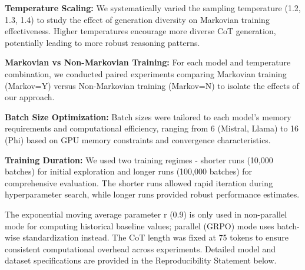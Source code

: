 \documentclass{article}
\begin{document}
\textbf{Temperature Scaling:} We systematically varied the sampling temperature (1.2, 1.3, 1.4) to study the effect of generation diversity on Markovian training effectiveness. Higher temperatures encourage more diverse CoT generation, potentially leading to more robust reasoning patterns.

\textbf{Markovian vs Non-Markovian Training:} For each model and temperature combination, we conducted paired experiments comparing Markovian training (Markov=Y) versus Non-Markovian training (Markov=N) to isolate the effects of our approach.

\textbf{Batch Size Optimization:} Batch sizes were tailored to each model's memory requirements and computational efficiency, ranging from 6 (Mistral, Llama) to 16 (Phi) based on GPU memory constraints and convergence characteristics.

\textbf{Training Duration:} We used two training regimes - shorter runs (10,000 batches) for initial exploration and longer runs (100,000 batches) for comprehensive evaluation. The shorter runs allowed rapid iteration during hyperparameter search, while longer runs provided robust performance estimates.

The exponential moving average parameter r (0.9) is only used in non-parallel mode for computing historical baseline values; parallel (GRPO) mode uses batch-wise standardization instead. The CoT length was fixed at 75 tokens to ensure consistent computational overhead across experiments. Detailed model and dataset specifications are provided in the Reproducibility Statement below.
\end{document}

